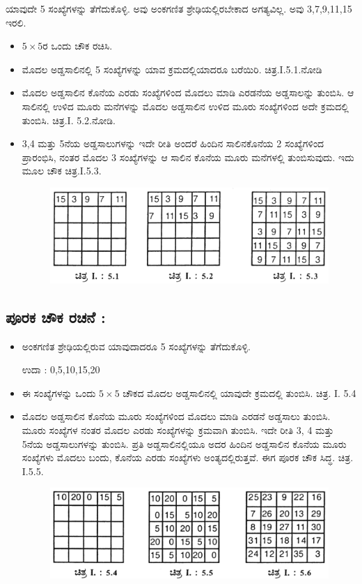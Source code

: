 ಯಾವುದೇ 5 ಸಂಖ್ಯೆಗಳನ್ನು ತೆಗೆದುಕೊಳ್ಳಿ. ಅವು ಅಂಕಗಣಿತ ಶ್ರೇಢಿಯಲ್ಲಿರಬೇಕಾದ ಅಗತ್ಯ\-ವಿಲ್ಲ. ಅವು 3,7,9,11,15 ಇರಲಿ.
\begin{itemize}
	\item $5 \times 5$ರ ಒಂದು ಚೌಕ ರಚಿಸಿ.
	\item ಮೊದಲ ಅಡ್ಡಸಾಲಿನಲ್ಲಿ 5 ಸಂಖ್ಯೆಗಳನ್ನು ಯಾವ ಕ್ರಮದಲ್ಲಿಯಾದರೂ ಬರೆಯಿರಿ. ಚಿತ್ರ.I.5.1.ನೋಡಿ
	\item ಮೊದಲ ಅಡ್ಡಸಾಲಿನ ಕೊನೆಯ ಎರಡು ಸಂಖ್ಯೆಗಳಿಂದ ಮೊದಲು ಮಾಡಿ ಎರಡನೆಯ ಅಡ್ಡಸಾಲನ್ನು ತುಂಬಿಸಿ. ಆ ಸಾಲಿನಲ್ಲಿ ಉಳಿದ ಮೂರು ಮನೆಗಳನ್ನು ಮೊದಲ ಅಡ್ಡಸಾಲಿನ ಉಳಿದ ಮೂರು ಸಂಖ್ಯೆಗಳಿಂದ ಅದೇ ಕ್ರಮದಲ್ಲಿ ತುಂಬಿಸಿ. ಚಿತ್ರ.I. 5.2.ನೋಡಿ.
	\item 3,4 ಮತ್ತು 5ನೆಯ ಅಡ್ಡಸಾಲುಗಳನ್ನು ಇದೇ ರೀತಿ ಅಂದರೆ ಹಿಂದಿನ ಸಾಲಿನ\break ಕೊನೆಯ 2 ಸಂಖ್ಯೆಗಳಿಂದ ಪ್ರಾರಂಭಿಸಿ, ನಂತರ ಮೊದಲ 3 ಸಂಖ್ಯೆಗಳನ್ನು ಆ ಸಾಲಿನ ಕೊನೆಯ ಮೂರು ಮನೆಗಳಲ್ಲಿ ತುಂಬಿಸುವುದು. ಇದು ಮೂಲ ಚೌಕ ಚಿತ್ರ.I.5.3.

\newpage

	\begin{figure}[h]
	\includegraphics{src/figures/chap3/fig3-11.jpg}
	\end{figure}
\end{itemize}

\subsection*{ಪೂರಕ ಚೌಕ ರಚನೆ :}

\begin{itemize}
	\item ಅಂಕಗಣಿತ ಶ್ರೇಢಿಯಲ್ಲಿರುವ ಯಾವುದಾದರೂ 5 ಸಂಖ್ಯೆಗಳನ್ನು ತೆಗೆದುಕೊಳ್ಳಿ.

	ಉದಾ : 0,5,10,15,20
	\item ಈ ಸಂಖ್ಯೆಗಳನ್ನು ಒಂದು $5 \times 5$ ಚೌಕದ ಮೊದಲ ಅಡ್ಡಸಾಲಿನಲ್ಲಿ ಯಾವುದೇ ಕ್ರಮದಲ್ಲಿ ತುಂಬಿಸಿ. ಚಿತ್ರ. I. 5.4
	\item ಮೊದಲ ಅಡ್ಡಸಾಲಿನ ಕೊನೆಯ ಮೂರು ಸಂಖ್ಯೆಗಳಿಂದ ಮೊದಲು ಮಾಡಿ ಎರಡನೆ ಅಡ್ಡಸಾಲು ತುಂಬಿಸಿ. ಮೂರು ಸಂಖ್ಯೆಗಳ ನಂತರ ಮೊದಲ ಎರಡು ಸಂಖ್ಯೆಗಳನ್ನು ಕ್ರಮವಾಗಿ ತುಂಬಿಸಿ. ಇದೇ ರೀತಿ 3, 4 ಮತ್ತು 5ನೆಯ ಅಡ್ಡಸಾಲುಗಳನ್ನು ತುಂಬಿಸಿ. ಪ್ರತಿ ಅಡ್ಡಸಾಲಿನಲ್ಲಿಯೂ ಅದರ ಹಿಂದಿನ ಅಡ್ಡಸಾಲಿನ ಕೊನೆಯ ಮೂರು ಸಂಖ್ಯೆಗಳು ಮೊದಲು ಬಂದು, ಕೊನೆಯ ಎರಡು ಸಂಖ್ಯೆಗಳು ಅಂತ್ಯದಲ್ಲಿರುತ್ತವೆ. ಈಗ ಪೂರಕ ಚೌಕ ಸಿದ್ಧ. ಚಿತ್ರ. I.5.5.
	\begin{figure}[h]
	\includegraphics{src/figures/chap3/fig3-12.jpg}
	\end{figure}
\end{itemize}

